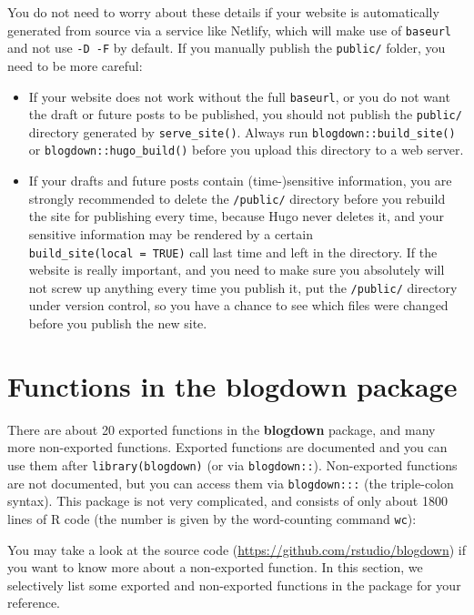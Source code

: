\documentclass[12pt,]{krantz}
\theoremstyle{definition}
\theoremstyle{definition}
\theoremstyle{definition}
\theoremstyle{remark}
\begin{document}
You do not need to worry about these details if your website is
automatically generated from source via a service like Netlify, which
will make use of \texttt{baseurl} and not use \texttt{-D\ -F} by
default. If you manually publish the \texttt{public/} folder, you need
to be more careful:

\begin{itemize}
\item
  If your website does not work without the full \texttt{baseurl}, or
  you do not want the draft or future posts to be published, you should
  not publish the \texttt{public/} directory generated by
  \texttt{serve\_site()}. Always run \texttt{blogdown::build\_site()} or
  \texttt{blogdown::hugo\_build()} before you upload this directory to a
  web server.
\item
  If your drafts and future posts contain (time-)sensitive information,
  you are strongly recommended to delete the \texttt{/public/} directory
  before you rebuild the site for publishing every time, because Hugo
  never deletes it, and your sensitive information may be rendered by a
  certain \texttt{build\_site(local\ =\ TRUE)} call last time and left
  in the directory. If the website is really important, and you need to
  make sure you absolutely will not screw up anything every time you
  publish it, put the \texttt{/public/} directory under version control,
  so you have a chance to see which files were changed before you
  publish the new site.
\end{itemize}

\hypertarget{functions}{%
\section{Functions in the blogdown package}\label{functions}}

There are about 20 exported functions in the
\textbf{blogdown} package, and many more non-exported functions.
Exported functions are documented and you can use them after
\texttt{library(blogdown)} (or via \texttt{blogdown::}). Non-exported
functions are not documented, but you can access them via
\texttt{blogdown:::} (the triple-colon syntax). This package is not very
complicated, and consists of only about 1800 lines of R code (the number
is given by the word-counting command \texttt{wc}):

You may take a look at the source code
(\url{https://github.com/rstudio/blogdown}) if you want to know more
about a non-exported function. In this section, we selectively list some
exported and non-exported functions in the package for your reference.
\end{document}
